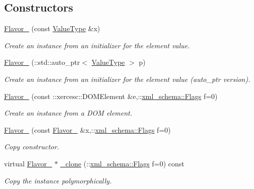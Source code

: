 \subsection*{Constructors}
\begin{DoxyCompactItemize}
\item 
\hyperlink{classopenstack_1_1xml_1_1Flavor___af75673e9e7338a76e83fee310e769340}{Flavor\_\-} (const \hyperlink{classopenstack_1_1xml_1_1Flavor}{ValueType} \&x)
\begin{DoxyCompactList}\small\item\em Create an instance from an initializer for the element value. \item\end{DoxyCompactList}\item 
\hyperlink{classopenstack_1_1xml_1_1Flavor___ad39aa3eac4ca634377f74e9a0253a534}{Flavor\_\-} (::std::auto\_\-ptr$<$ \hyperlink{classopenstack_1_1xml_1_1Flavor}{ValueType} $>$ p)
\begin{DoxyCompactList}\small\item\em Create an instance from an initializer for the element value (auto\_\-ptr version). \item\end{DoxyCompactList}\item 
\hyperlink{classopenstack_1_1xml_1_1Flavor___aba8434f08bd2c3eeea32de88b127c77e}{Flavor\_\-} (const ::xercesc::DOMElement \&e,::\hyperlink{namespacexml__schema_affb4c227cbd9aa7453dd1dc5a1401943}{xml\_\-schema::Flags} f=0)
\begin{DoxyCompactList}\small\item\em Create an instance from a DOM element. \item\end{DoxyCompactList}\item 
\hyperlink{classopenstack_1_1xml_1_1Flavor___a540daf797ef512ea1fff97615b4c9767}{Flavor\_\-} (const \hyperlink{classopenstack_1_1xml_1_1Flavor__}{Flavor\_\-} \&x,::\hyperlink{namespacexml__schema_affb4c227cbd9aa7453dd1dc5a1401943}{xml\_\-schema::Flags} f=0)
\begin{DoxyCompactList}\small\item\em Copy constructor. \item\end{DoxyCompactList}\item 
virtual \hyperlink{classopenstack_1_1xml_1_1Flavor__}{Flavor\_\-} $\ast$ \hyperlink{classopenstack_1_1xml_1_1Flavor___a720fc6e2956d4064a7d2d941c6ac9060}{\_\-clone} (::\hyperlink{namespacexml__schema_affb4c227cbd9aa7453dd1dc5a1401943}{xml\_\-schema::Flags} f=0) const 
\begin{DoxyCompactList}\small\item\em Copy the instance polymorphically. \item\end{DoxyCompactList}\end{DoxyCompactItemize}
